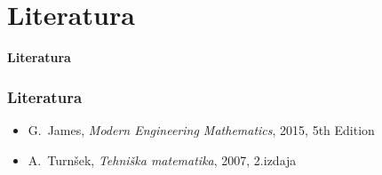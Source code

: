 \documentclass[8pt,aspectratio=169]{beamer} %
\begin{document}

\section*{Literatura}

\begin{frame}[plain,noframenumbering,label=references]
	\vfill
	\begin{center}
		\textcolor{royalblue1}{\textbf{\Large Literatura}}
	\end{center}
	\vfill
\end{frame}

	
\begin{frame}[plain]
	\frametitle{Literatura}
	\begin{itemize}
		\item G.~James, \emph{Modern Engineering Mathematics}, 2015, 5th Edition
		\item A.~Turnšek, \emph{Tehniška matematika}, 2007, 2.izdaja
	\end{itemize}
\end{frame}
\end{document}
